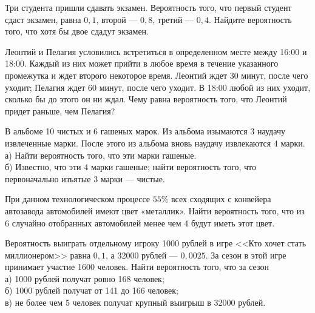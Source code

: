 

\begin{zkrW}{20}\noindent 
	Три студента пришли сдавать экзамен. Вероятность того, что первый студент сдаст экзамен, равна $0{,}1$, второй --- $0{,}8$, третий --- $0{,}4$. Найдите вероятность того, что хотя бы двое сдадут экзамен.
 
\end{zkrW}

\begin{zkrW}{20}\noindent 
	Леонтий и Пелагия условились встретиться в определенном месте между 16:00 и 18:00. Каждый из них может прийти в любое время в течение указанного промежутка и ждет второго некоторое время. Леонтий ждет 30 минут, после чего уходит; Пелагия ждет 60 минут, после чего уходит. В 18:00 любой из них уходит, сколько бы до этого он ни ждал. Чему равна вероятность того, что Леонтий придет раньше, чем Пелагия?
 
\end{zkrW}

\begin{zkrW}{20}\noindent 
	В альбоме 10 чистых и 6 гашеных марок. Из альбома изымаются 3 наудачу извлеченные марки. После этого из альбома вновь наудачу извлекаются 4 марки. \\ \indent а) Найти вероятность того, что эти марки гашеные. \\ \indent б) Известно, что эти 4 марки гашеные; найти вероятность того, что первоначально изъятые 3 марки --- чистые.
 
\end{zkrW}

\begin{zkrW}{20}\noindent 
	При данном технологическом процессе $55\%$ всех сходящих с конвейера автозавода автомобилей имеют цвет «металлик». Найти вероятность того, что из 6 случайно отобранных автомобилей менее чем 4 будут иметь этот цвет.
 
\end{zkrW}

\begin{zkrW}{20}\noindent 
	Вероятность выиграть отдельному игроку 1000 рублей в игре <<Кто хочет стать миллионером>> равна $0{,}1$, а 32000 рублей --- $0{,}0025$. За сезон в этой игре принимает участие 1600 человек. Найти вероятность того, что за сезон \\ \indent а) 1000 рублей получат ровно 168 человек; \\ \indent б) 1000 рублей получат от 141 до 166 человек; \\ \indent в) не более чем 5 человек получат крупный выигрыш в 32000 рублей.
 
\end{zkrW}

